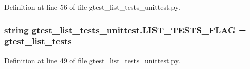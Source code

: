 Definition at line 56 of file gtest\+\_\+list\+\_\+tests\+\_\+unittest.\+py.

\subsubsection[{\texorpdfstring{L\+I\+S\+T\+\_\+\+T\+E\+S\+T\+S\+\_\+\+F\+L\+AG}{LIST_TESTS_FLAG}}]{\setlength{\rightskip}{0pt plus 5cm}string gtest\+\_\+list\+\_\+tests\+\_\+unittest.\+L\+I\+S\+T\+\_\+\+T\+E\+S\+T\+S\+\_\+\+F\+L\+AG = \textquotesingle{}gtest\+\_\+list\+\_\+tests\textquotesingle{}}\hypertarget{namespacegtest__list__tests__unittest_a658d9ea18c57a13a25d0cce73d314e7a}{}\label{namespacegtest__list__tests__unittest_a658d9ea18c57a13a25d0cce73d314e7a}


Definition at line 49 of file gtest\+\_\+list\+\_\+tests\+\_\+unittest.\+py.

